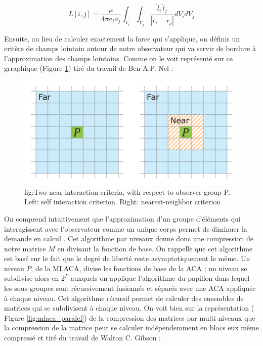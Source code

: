 \documentclass[10pt]{SelfArx} %
\begin{document}
\begin{equation}
    L[i,j]= \frac{\mu}{4\pi a_i a_j} \int_{V_i} \int_{V_j}\frac{\hat{l}_{i} \, \hat{l}_{j}}{|r_i - r_j|}dV_i dV_j 
\end{equation}

Ensuite, au lieu de calculer exactement la force qui s'applique, on définis un critère de champs lointain autour de notre observateur qui va servir de bordure à l'approximation des champs lointains. Comme on le voit représenté sur ce grraphique (Figure \ref{fig:far_neighbor}) tiré du travail de Ben A.P. Nel \cite{nel_mlaca_2019} :

\begin{figure}[ht]\centering
	\includegraphics[width=\linewidth]{far_neighbor.png}
	\captionsetup{justification=centering}
	\caption{fig:Two near-interaction criteria, with respect to observer group P. Left: self interaction criterion. Right: nearest-neighbor criterion \cite{nel_efficient_2019}}
	\label{fig:far_neighbor}
\end{figure}

On comprend intuitivement que l'approximation d'un groupe d'éléments qui interagissent avec l'observateur comme un unique corps permet de diminuer la demande en calcul \cite{nel_efficient_2019}. Cet algorithme par niveaux donne donc une compression de notre matrice $M$ en divisant la fonction de base. On rappelle que cet algorithme est basé sur le fait que le degré de liberté reste asymptotiquement le même. Un niveau $P$, de la MLACA, divise les fonctions de base de la ACA ; un niveau se subdivise alors en $2^P$ \cite{gibson_efficient_2020} auxquels on applique l'algorithme du papillon dans lequel les sous-groupes sont récursivement fusionnés et séparés avec une ACA appliquée à chaque niveau. Cet algorithme récursif permet de calculer des ensembles de matrices qui se subdivisent à chaque niveau. On voit bien sur la représentation ( Figure \ref{fig:mlaca_paralel}) de la compression des matrices par multi niveaux  que la compression de la matrice peut se calculer indépendemment en blocs eux même compressé et tiré du travail de Walton C. Gibson \cite{gibson_efficient_2020} :
\end{document}
